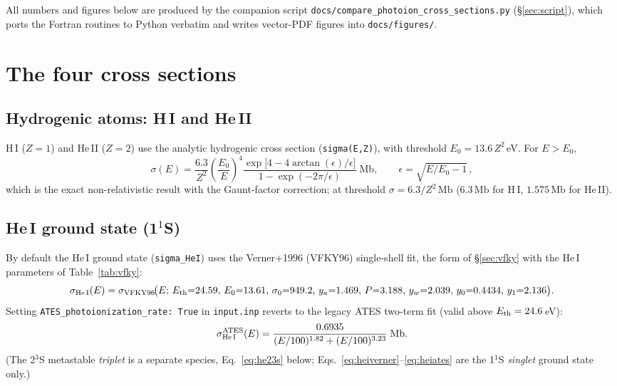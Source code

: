 \documentclass[english,a4paper]{my_memo}
\newcommand{\Mb}{\mathrm{Mb}}
\newcommand{\sig}{\sigma}
\begin{document}
All numbers and figures below are produced by the companion script
\texttt{docs/compare\_photoion\_cross\_sections.py}
(\S\ref{sec:script}), which ports the Fortran routines to Python verbatim
and writes vector-PDF figures into \texttt{docs/figures/}.

\section{The four cross sections}\label{sec:formulas}

\subsection{Hydrogenic atoms: H\,I and He\,II}

H\,I ($Z=1$) and He\,II ($Z=2$) use the analytic hydrogenic cross section
(\texttt{sigma(E,Z)}), with threshold $E_0 = 13.6\,Z^2\,$eV. For $E>E_0$,
\begin{equation}
  \sig(E) = \frac{6.3}{Z^2}\left(\frac{E_0}{E}\right)^{\!4}
            \frac{\exp\!\big[4 - 4\arctan(\epsilon)/\epsilon\big]}
                 {1 - \exp(-2\pi/\epsilon)}\;\Mb,
  \qquad \epsilon = \sqrt{E/E_0 - 1}\,,
\end{equation}
which is the exact non-relativistic result with the Gaunt-factor
correction; at threshold $\sig = 6.3/Z^2\,\Mb$ ($6.3\,\Mb$ for H\,I,
$1.575\,\Mb$ for He\,II).

\subsection{He\,I ground state (1$^1$S)}

By default the He\,I ground state (\texttt{sigma\_HeI}) uses the
Verner+1996 (VFKY96) single-shell fit, the form of \S\ref{sec:vfky}
with the He\,I parameters of Table~\ref{tab:vfky}:
\begin{equation}
  \sig_{\rm He\,I}(E) = \sig_{\rm VFKY96}\!\big(E;\,
    E_{\rm th}{=}24.59,\,E_0{=}13.61,\,\sig_0{=}949.2,\,y_a{=}1.469,\,
    P{=}3.188,\,y_w{=}2.039,\,y_0{=}0.4434,\,y_1{=}2.136\big).
  \label{eq:heiverner}
\end{equation}
Setting \texttt{ATES\_photoionization\_rate: True} in \texttt{input.inp}
reverts to the legacy ATES two-term fit (valid above $E_{\rm th}=24.6\,$eV):
\begin{equation}
  \sig_{\rm He\,I}^{\rm ATES}(E) = \frac{0.6935}
       {(E/100)^{1.82} + (E/100)^{3.23}}\;\Mb .
  \label{eq:heiates}
\end{equation}
(The 2$^3$S metastable \emph{triplet} is a separate species,
Eq.~\ref{eq:he23s} below; Eqs.~\ref{eq:heiverner}--\ref{eq:heiates} are the
1$^1$S \emph{singlet} ground state only.)
\end{document}
